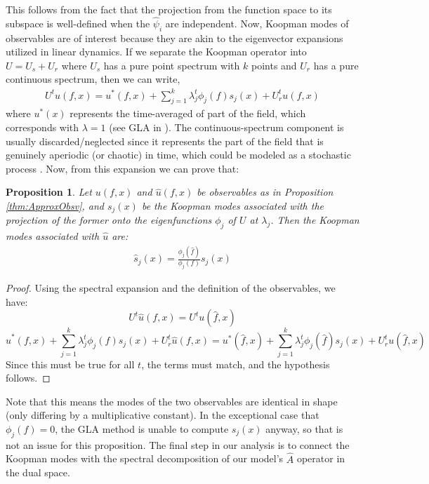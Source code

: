 \documentclass[letterpaper,12pt,peerreviewca,draftcls]{IEEEtran}
\newtheorem{proposition}{Proposition}
\newcommand{\fmap}{\psi}
\newcommand{\eqlabel}[1]{\label{eq:#1}}
\newcommand{\fmapApprox}{\widehat{\fmap}}
\newcommand{\fspaceEl}{f}
\newcommand{\fspaceApproxEl}{\widehat{\fspaceEl}}
\newcommand{\dualop}{A}
\newcommand{\dualopApprox}{\widehat{\dualop}}
\begin{document}
This follows from the fact that the projection from the function space to its subspace is well-defined when the $\fmapApprox_i$ are independent. Now, Koopman modes of observables are of interest because they are akin to the eigenvector expansions utilized in linear dynamics. If we separate the Koopman operator into $U = U_s + U_r$ where $U_s$ has a pure point spectrum with $k$ points and $U_r$ has a pure continuous spectrum, then we can write,
\begin{align} \eqlabel{spectral_expansion}
U^t u(\fspaceEl,x) = u^{\ast}(\fspaceEl,x) + \sum_{j=1}^k \lambda_j^t \phi_j(\fspaceEl) s_j (x)  +  U_r^t u(\fspaceEl,x)
\end{align}
where $u^{\ast}(x)$ represents the time-averaged of part of the field, which corresponds with $\lambda=1$ (see GLA in \cite{mezic2013analysis}). The continuous-spectrum component is usually discarded/neglected since it represents the part of the field that is genuinely aperiodic (or chaotic) in time, which could be modeled as a stochastic process \cite{mezic2013analysis}. Now, from this expansion we can prove that:

\begin{proposition}\label{prop:ApproxModes}
	Let $u(\fspaceEl,x)$ and $\hat u(\fspaceEl,x)$ be observables as in Proposition \ref{thm:ApproxObsv}, and $s_j(x)$ be the Koopman modes associated with the projection of the former onto the eigenfunctions $\phi_j$ of $U$ at $\lambda_j$. Then the Koopman modes associated with $\hat u$ are:
	\begin{align}
	\hat s_j(x) = \frac{\phi_j(\fspaceApproxEl)}{\phi_j(\fspaceEl)} s_j(x)
	\end{align}
\end{proposition}
\begin{proof}
	Using the spectral expansion and the definition of the observables, we have:
	$$U^t \hat u(\fspaceEl,x) = U^t u(\fspaceApproxEl,x) $$
	$$ \hat u^{\ast}(\fspaceEl,x) + \sum_{j=1}^k \lambda_j^t \phi_j(\fspaceEl) \hat s_j (x)  +  U_r^t \hat u(\fspaceEl,x) = u^{\ast}(\fspaceApproxEl,x) + \sum_{j=1}^k \lambda_j^t \phi_j(\fspaceApproxEl) s_j (x)  +  U_r^t u(\fspaceApproxEl,x)$$
	Since this must be true for all $t$, the terms must match, and the hypothesis follows.%
\end{proof}


Note that this means the modes of the two observables are identical in shape (only differing by a multiplicative constant). In the exceptional case that $\phi_j(\fspaceEl)=0$, the GLA method is unable to compute $s_j (x)$ anyway, so that is not an issue for this proposition. The final step in our analysis is to connect the Koopman modes with the spectral decomposition of  our model's $\dualopApprox$ operator in the dual space.
\end{document}
